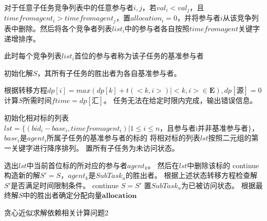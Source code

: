 \documentclass[promaster]{thesis-uestc}
\begin{document}
\begin{algorithm}[p]
    对于任意子任务竞争列表中的任意参与者$i,j$，若$val_i < val_j$，且$timefromagent_i > timefromagent_j$，置$allocation_i = 0$，并将参与者$i$从该竞争列表中删除。然后将各个竞争者列表$list_i$中的参与者各自按照$timefromagent$关键字递增排序。\;

    此时每个竞争列表$list_i$首位的参与者称为该子任务的基准参与者\;

    初始化解$S$，其所有子任务的胜出者为各自基准参与者。\;
    
    根据转移方程$dp[i] = max(dp[k]+t(<k,i>)|<k,i> \in \mathbf{E}),dp[\text{源}] = 0$计算$S$所需时间$ftime = dp[\text{汇}]$。\;
    {
        任务无法在给定时限内完成，输出错误信息。\;
    }


    初始化相对标的列表$lst=\{(bid_i - base_i,timefromagent_i)|1 \leq i \leq n，\text{且参与者i并非基准参与者}\}$，$base_i$是$agent_i$所属子任务的基准参与者的标的\;
    将相对标的列表$lst$按照二元组的第一关键字进行降序排列。\;
    置所有子任务为未访问状态。\;

    {
        选出$lst$中当前首位标的所对应的参与者$agent_k$。\;
        然后在$lst$中删除该标的\;
        {
            continue\;
        }
        构造新的解$S' = S$，$agent_k$是$SubTask_u$的胜出者。\;
        根据上述状态转移方程检查解$S'$是否满足时间限制条件。\;
        {
            continue\;
        }
        $S=S'$\;
        置$SubTask_u$为已被访问状态。\;
    }
    根据最终解$S$中的胜出者确定分配向量$\mathbf{allocation}$\;
\caption{贪心近似求解依赖相关计算问题2}
\label{jichumoxing2tanxin2}
\end{algorithm}

\end{document}
